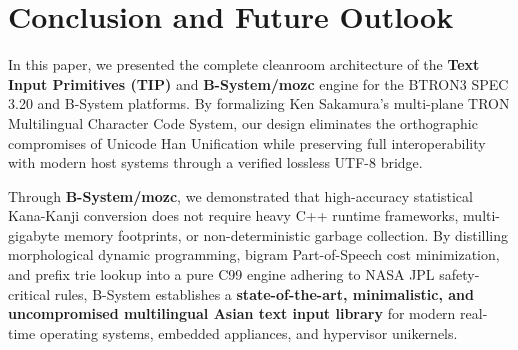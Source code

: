 \documentclass[10pt,journal,compsoc,twocolumn]{article}
\begin{document}
\section{Conclusion and Future Outlook}
\label{sec:conclusion}

In this paper, we presented the complete cleanroom architecture of the \textbf{Text Input Primitives (TIP)} and \textbf{B-System/mozc} engine for the BTRON3 SPEC 3.20 and B-System platforms. By formalizing Ken Sakamura's multi-plane TRON Multilingual Character Code System, our design eliminates the orthographic compromises of Unicode Han Unification while preserving full interoperability with modern host systems through a verified lossless UTF-8 bridge.

Through \textbf{B-System/mozc}, we demonstrated that high-accuracy statistical Kana-Kanji conversion does not require heavy C++ runtime frameworks, multi-gigabyte memory footprints, or non-deterministic garbage collection. By distilling morphological dynamic programming, bigram Part-of-Speech cost minimization, and prefix trie lookup into a pure C99 engine adhering to NASA JPL safety-critical rules, B-System establishes a \textbf{state-of-the-art, minimalistic, and uncompromised multilingual Asian text input library} for modern real-time operating systems, embedded appliances, and hypervisor unikernels.
\end{document}
